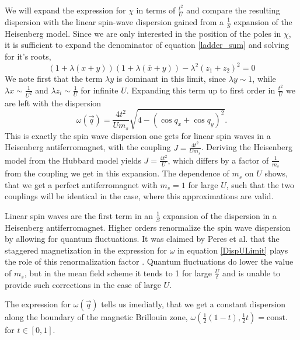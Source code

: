 \documentclass[a4paper,12pt]{report}
\begin{document}
%
%

We will expand the expression for $\chi$ in terms of $\frac{t^2}{U}$ 
and compare the resulting dispersion with the linear spin-wave dispersion gained from a $\frac1S$ expansion of the Heisenberg model.
Since we are only interested in the position of the poles in $\chi$, it is sufficient to expand the denominator of equation \ref{ladder_sum} and solving for it's roots,
\begin{equation}
 \left(1+\lambda(x+y)\right)\left(1+\lambda(\bar x + y)\right) - \lambda^2(z_1 +z_2)^2 = 0
\end{equation}
We note first that the term $\lambda y$ is dominant in this limit, since $\lambda y \sim 1$, while $\lambda x \sim \frac1{U^2}$ and $\lambda z_i \sim \frac1U$
for infinite $U$.
Expanding this term
up to first order in  $\frac{t^2}U$ we are left with the dispersion
\begin{equation}\label{DispULimit}
 \omega(\vec q) = \frac{4t^2}{Um_s}\sqrt{4-(\cos q_x+\cos q_y)^2}. 
\end{equation}
This is exactly the spin wave dispersion one gets for linear spin waves in a Heisenberg antiferromagnet, 
with the coupling $J=\frac{4t^2}{Um_s}$.
Deriving the Heisenberg model from the Hubbard model yields $J=\frac{4t^2}{U}$, which differs by a factor of $\frac1{m_s}$ from the coupling we get in this expansion.
The dependence of $m_s$ on $U$ shows, that we get a perfect antiferromagnet with $m_s=1$ for large $U$, 
such that the two couplings will be identical in the case, where this approximations are valid. 
%

Linear spin waves are the first term in an $\frac1S$ expansion of the dispersion in a Heisenberg antiferromagnet.
Higher orders renormalize the spin wave dispersion by allowing for quantum fluctuations.
It was claimed by Peres et al. that the staggered magnetization in the expression for $\omega$ in equation \ref{DispULimit} 
plays the role of this renormalization factor \cite{PhysRevB.65.132404}.
Quantum fluctuations do lower the value of $m_s$, but in the mean field scheme it tends to 1 for large $\frac Ut$ 
and is unable to provide such corrections in the case of large $U$.

The expression for $\omega(\vec q)$ tells us imediatly, that we get a constant dispersion along the 
boundary of the magnetic Brillouin zone, $\omega(\frac12(1-t), \frac12t) =\mathrm{const.}$ for $t \in [0,1]$.
\end{document}

